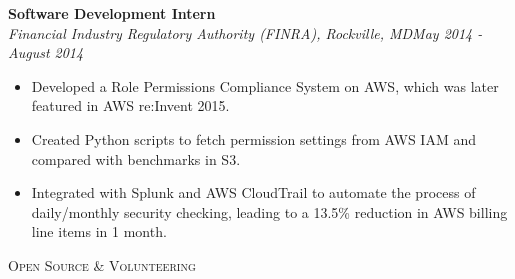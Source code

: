 \documentclass[3pt]{article}
\newenvironment{changemargin}[2]{%
  \begin{list}{}{%
    \setlength{\topsep}{0pt}%
    \setlength{\leftmargin}{#1}%
    \setlength{\rightmargin}{#2}%
    \setlength{\listparindent}{\parindent}%
    \setlength{\itemindent}{\parindent}%
    \setlength{\parsep}{\parskip}%
  }%
  \item[]}{\end{list}
}
\newcommand{\lineover}{
	\begin{changemargin}{-0.05in}{-0.05in}
		\vspace*{-8pt}
		\hrulefill \\
		\vspace*{-2pt}
	\end{changemargin}
}
\newcommand{\header}[1]{
	\begin{changemargin}{-0.5in}{-0.5in}
		{\Large \scshape{#1}}\\
  	\lineover
	\end{changemargin}
}
\newenvironment{body} {
	\vspace*{-16pt}
	\begin{changemargin}{-0.25in}{-0.5in}
  }	
	{\end{changemargin}
}
\begin{document}
\begin{body}
   \vspace{5pt}

    \textbf{Software Development Intern} \\

    \emph{Financial Industry Regulatory Authority (FINRA), Rockville, MD}\hfill \emph{May 2014 - August 2014}\\
     \begin{itemize} \itemsep -0.5pt
    \item{Developed a Role Permissions Compliance System on AWS, which was later featured in AWS re:Invent 2015.}
     \item {Created Python scripts to fetch permission settings from AWS IAM and compared with benchmarks in S3.}
     \item {Integrated with Splunk and AWS CloudTrail to automate the process of daily/monthly security checking, leading to a 13.5\% reduction in AWS billing line items in 1 month.}
   
    \end{itemize}
	

\end{body}
\bigskip


\header{Open Source \& Volunteering}
\end{document}
